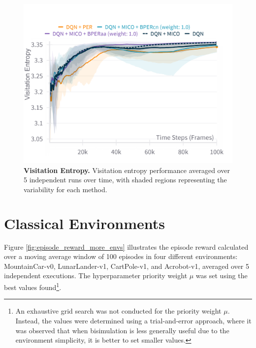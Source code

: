 \begin{figure}[H]
    \centering
    \includegraphics[width=0.7\linewidth]{Results/grid_world/state_visitation_entropy.png}
    \caption[Visitation Entropy]{\textbf{Visitation Entropy.} Visitation entropy performance averaged over 5 independent runs over time, with shaded regions representing the variability for each method.}
    \label{fig:visitation_entropy}
\end{figure}


\section{Classical Environments}

Figure \ref{fig:episode_reward_more_envs} illustrates the episode reward calculated over a moving average window of 100 episodes in four different environments: MountainCar-v0, LunarLander-v1, CartPole-v1, and Acrobot-v1, averaged over 5 independent executions. The hyperparameter priority weight $\mu$ was set using the best values found\footnote{An exhaustive grid search was not conducted for the priority weight $\mu$. Instead, the values were determined using a trial-and-error approach, where it was observed that when bisimulation is less generally useful due to the environment simplicity, it is better to set smaller values.}. %

